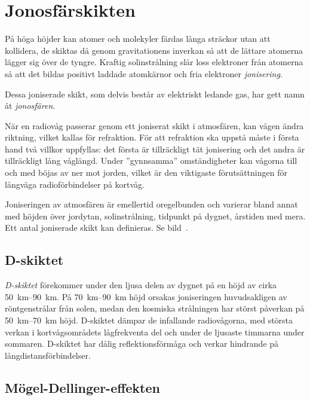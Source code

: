 \section{Jonosfärskikten}
\label{vågutbredning_jonosfärskikten}

På höga höjder kan atomer och molekyler färdas långa sträckor utan att
kollidera, de skiktas då genom gravitationens inverkan så att de lättare
atomerna lägger sig över de tyngre.
Kraftig solinstrålning slår loss elektroner från atomerna så att det bildas
positivt laddade atomkärnor och fria elektroner \emph{jonisering}.

Dessa joniserade skikt, som delvis består av elektriskt ledande gas, har
gett namn åt \emph{jonosfären}.

När en radiovåg passerar genom ett joniserat skikt i atmosfären, kan vågen
ändra riktning, vilket kallas för refraktion.
För att refraktion ska uppstå måste i första hand två villkor uppfyllas: det
första är tillräckligt tät jonisering och det andra är tillräckligt
lång våglängd.
Under ''gynnsamma'' omständigheter kan vågorna till och med böjas av
ner mot jorden, vilket är den viktigaste förutsättningen för långväga
radioförbindelser på kortvåg.

Joniseringen av atmosfären är emellertid oregelbunden och varierar
bland annat med höjden över jordytan, solinstrålning, tidpunkt på dygnet,
årstiden med mera.
Ett antal joniserade skikt kan definieras.
Se bild~.

\subsection{D-skiktet}
\label{d-skiktet}

\emph{D-skiktet} förekommer under den ljusa delen av dygnet på en höjd av cirka
\SIrange{50}{90}{\kilo\metre}.
På \SIrange{70}{90}{\kilo\metre} höjd orsakas joniseringen huvudsakligen av
röntgenstrålar från solen, medan den kosmiska strålningen har störst påverkan på
\SIrange{50}{70}{\kilo\metre} höjd.
D-skiktet dämpar de infallande radiovågorna, med största verkan i
kortvågsområdets lågfrekventa del och under de ljusaste timmarna under sommaren.
D-skiktet har dålig reflektionsförmåga och verkar hindrande på
långdistansförbindelser.

\subsection{Mögel-Dellinger-effekten}

